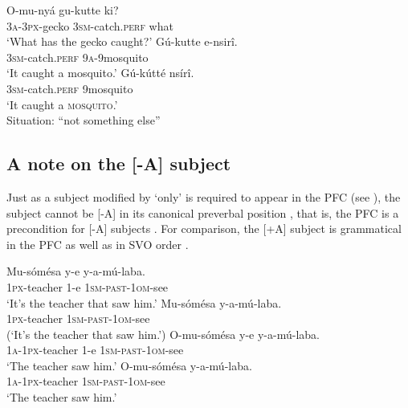 \documentclass[output=paper]{langsci/langscibook}
\begin{document}
\ea\label{ex:vanderwal:33}
\ea\label{ex:vanderwal:33a}
\gll     O-mu-nyá    gu-kutte    ki?\\
         \textsc{3a}-\textsc{3px}-gecko  \textsc{3sm}-catch.\textsc{perf}  what\\
\glt     ‘What has the gecko caught?’
\ex\label{ex:vanderwal:33b}
\gll    Gú-kutte    e-nsirî.\\
         \textsc{3sm}-catch.\textsc{perf}  \textsc{9a}-9mosquito\\
\glt     ‘It caught a mosquito.’
\ex\label{ex:vanderwal:33c}
\gll    Gú-kútté    nsírî.\\
         \textsc{3sm}-catch.\textsc{perf}  9mosquito\\
\glt ‘It caught a \textsc{mosquito}.’\\
Situation: “not something else”
\z
\z

\subsection{A note on the [-A] subject}\label{sec:vanderwal:4.6} %

Just as a subject modified by ‘only’ is required to appear in the PFC (see ), the subject cannot be [-A] in its canonical preverbal position , that is, the PFC is a precondition for [-A] subjects . For comparison, the [+A] subject is grammatical in the PFC  as well as in SVO order .

\ea\label{ex:vanderwal:34}
\ea\label{ex:vanderwal:34a}
\gll   Mu-sómésa  y-e  y-a-mú-laba.\\
         \textsc{1px}-teacher  1-e  \textsc{1sm}-\textsc{past}-\textsc{1om}-see\\
\glt     ‘It’s the teacher that saw him.’
\ex\label{ex:vanderwal:34b}
\gll      *Mu-sómésa  y-a-mú-laba.\\
         \textsc{1px}-teacher  \textsc{1sm}-\textsc{past}-\textsc{1om}-see\\
\glt     (‘It’s the teacher that saw him.’)
\ex\label{ex:vanderwal:34c}
\gll    O-mu-sómésa  y-e  y-a-mú-laba.\\
         \textsc{1a}-\textsc{1px}-teacher  1-e  \textsc{1sm}-\textsc{past}-\textsc{1om}-see\\
\glt     ‘The teacher saw him.’
\ex\label{ex:vanderwal:34d}
\gll   O-mu-sómésa  y-a-mú-laba.\\
         \textsc{1a}-\textsc{1px}-teacher  \textsc{1sm}-\textsc{past}-\textsc{1om}-see\\
\glt     ‘The teacher saw him.’
\z
\z
\end{document}
